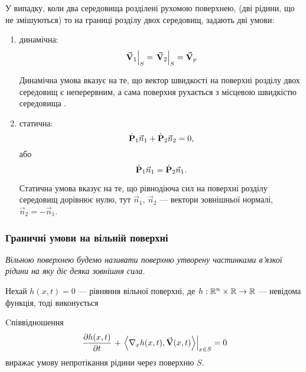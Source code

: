 У випадку, коли два середовища розділені рухомою поверхнею, (дві рідини, що не змішуються) то на границі розділу двох середовищ, задають дві умови:
\begin{enumerate}
 	\item динамічна:
 	\begin{equation}
 		\left. \vecf V_1 \right|_S = \left. \vecf V_2 \right|_S = \vecf V_p
 	\end{equation}

	\begin{remark}
		Динамічна умова вказує на те, що вектор швидкості на поверхні розділу двох середовищ є неперервним, а сама поверхня рухається з місцевою швидкістю середовища  . 
	\end{remark}

 	\item статична:
 	\begin{equation}
 		\dot{\bf{P}}_1 \vec n_1 + \dot{\bf{P}}_2 \vec n_2 = 0,
 	\end{equation}
 	або
 	\begin{equation}
 		\dot{\bf{P}}_1 \vec n_1 = \dot{\bf{P}}_2 \vec n_1.
 	\end{equation}

	\begin{remark}
		Статична умова вказує на те, що рівнодіюча сил на поверхні розділу середовищ дорівнює нулю, тут $\vec n_1$, $\vec n_2$ --- вектори зовнішньої нормалі, $\vec n_2 = - \vec n_1$.
	\end{remark}
\end{enumerate}

\subsubsection{Граничні умови на вільній поверхні}

\begin{definition}
	\it{Вільною поверхнею} будемо називати поверхню утворену частинками в'язкої рідини на яку діє деяка зовнішня сила.
\end{definition}

Нехай $h(x, t) = 0$ --- рівняння вільної поверхні, де $h: \RR^n\times \RR \to \RR$ --- невідома функція, тоді виконується
\begin{th_condition}
	Cпіввідношення 
	\begin{equation}
		\left. \frac{\partial h(x, t)}{\partial t} \right. + \left. \langle \nabla_x h(x , t), \vecf V(x,t) \rangle \right|_{x \in S} = 0
	\end{equation}
	виражає умову непротікання рідини через поверхню $S$.
\end{th_condition}

